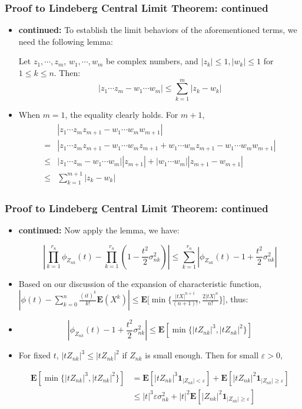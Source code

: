 \documentclass[handout]{beamer}
\newcommand{\BE}{\mathbf{E}}
\newcommand{\BI}{\mathbf{1}}
\begin{document}
 
      \frame
{
  \frametitle{Proof to Lindeberg Central Limit Theorem: continued}
   \begin{itemize}

\item<1->\textbf{continued:} To establish the limit behaviors of the aforementioned terms, we need the following lemma: 
 \begin{Lemma} Let $z_1, \cdots, z_m$, $w_1, \cdots, w_m$ be complex numbers, and $|z_k|\leq 1, |w_k|\leq 1$ for $1\leq k\leq n$. Then: $$|z_1\cdots z_m-w_1\cdots w_m|\leq \sum_{k=1}^m |z_k-w_k|$$
\end{Lemma}

\item<2->[-] When $m=1$, the equality clearly holds. For $m+1$, 
\begin{gather}
\begin{align*}& |z_1\cdots z_mz_{m+1}-w_1\cdots w_m w_{m+1}| \\  = & |z_1\cdots z_mz_{m+1}-w_1\cdots w_m z_{m+1}+ w_1\cdots w_m z_{m+1}-w_1\cdots w_m w_{m+1}| \\ \leq & |z_1\cdots z_m-w_1\cdots w_m| |z_{m+1}|+|w_1\cdots w_m| |z_{m+1}-w_{m+1}| \\  \leq & \sum_{k=1}^{m+1} |z_k-w_k|\end{align*}
\end{gather}

\end{itemize}
}




 
      \frame
{
  \frametitle{Proof to Lindeberg Central Limit Theorem: continued}
   \begin{itemize}

\item<1->\textbf{continued:}  Now apply the lemma, we have:

$$|\prod_{k=1}^{r_n} \phi_{Z_{nk}}(t)-\prod_{k=1}^{r_n} (1-\frac{t^2}{2} \sigma^2_{nk})| \leq \sum_{k=1}^{r_n} | \phi_{Z_{nk}}(t)-1+\frac{t^2}{2} \sigma^2_{nk} |$$
\item<2->[-] Based on our discussion of the expansion of characteristic function,  $|\phi(t) -\sum_{k=0}^n \frac{(it)^k}{k!} \BE(X^k) | \leq  \BE \big [ \min \{ \frac{|tX|^{n+1}}{(n+1)!},  \frac{2|tX|^{n}}{n!} \} \big]$, thus:
\item<3->[] $$|\phi_{Z_{nk}}(t)-1+\frac{t^2}{2} \sigma^2_{nk} | \leq \BE[\min \{|tZ_{nk}|^3, |tZ_{nk}|^2\}]$$

\item<4->[-] For fixed $t$, $|tZ_{nk}|^3\leq |tZ_{nk}|^2$ if $Z_{nk}$ is small enough. Then for small $\varepsilon>0$,

\begin{align*}\BE[\min \{|tZ_{nk}|^3, |tZ_{nk}|^2\}] &  =\BE[|tZ_{nk}|^3\BI_{|Z_{nk}|< \varepsilon}]+\BE[|tZ_{nk}|^2 \BI_{|Z_{nk}|  \geq \varepsilon}] \\ & \leq |t|^3\varepsilon \sigma_{nk}^2+ |t|^2 \BE[|Z_{nk}|^2 \BI_{|Z_{nk}|\geq \varepsilon}] 
\end{align*}

\end{itemize}
}
\end{document}
